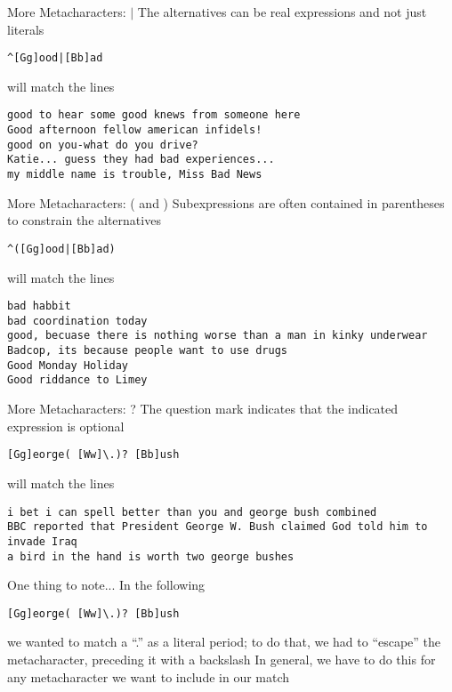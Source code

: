\documentclass[aspectratio=169]{beamer}
\begin{document}
\begin{frame}[fragile]{More Metacharacters: $|$}
The alternatives can be real expressions and not just literals
\begin{verbatim}
^[Gg]ood|[Bb]ad
\end{verbatim}
will match the lines 
\begin{verbatim}
good to hear some good knews from someone here 
Good afternoon fellow american infidels! 
good on you-what do you drive? 
Katie... guess they had bad experiences... 
my middle name is trouble, Miss Bad News
\end{verbatim}
\end{frame}

\begin{frame}[fragile]{More Metacharacters: ( and )}
Subexpressions are often contained in parentheses to constrain the 
alternatives
\begin{verbatim}
^([Gg]ood|[Bb]ad)
\end{verbatim}
will match the lines 
\begin{verbatim}
bad habbit 
bad coordination today 
good, becuase there is nothing worse than a man in kinky underwear
Badcop, its because people want to use drugs 
Good Monday Holiday 
Good riddance to Limey
\end{verbatim}
\end{frame}

\begin{frame}[fragile]{More Metacharacters: ?}
The question mark indicates that the indicated expression is optional
\begin{verbatim}
[Gg]eorge( [Ww]\.)? [Bb]ush
\end{verbatim}
will match the lines 
\begin{verbatim}
i bet i can spell better than you and george bush combined
BBC reported that President George W. Bush claimed God told him to invade Iraq 
a bird in the hand is worth two george bushes 
\end{verbatim}
\end{frame}

\begin{frame}[fragile]{One thing to note...}
In the following
\begin{verbatim}
[Gg]eorge( [Ww]\.)? [Bb]ush
\end{verbatim}
we wanted to match a ``.'' as a literal period; to do that, we had to
``escape'' the metacharacter, preceding it with a backslash In
general, we have to do this for any metacharacter we want to include
in our match
\end{frame}
\end{document}
